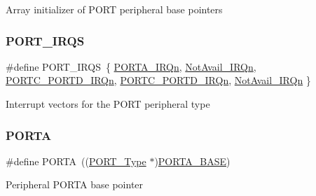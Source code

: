Array initializer of P\+O\+RT peripheral base pointers \mbox{\label{group___p_o_r_t___peripheral___access___layer_ga442cafa4ce211d588393a5f2954198bb}} 
\subsubsection{\texorpdfstring{PORT\_IRQS}{PORT\_IRQS}}
{\footnotesize\ttfamily \#define P\+O\+R\+T\+\_\+\+I\+R\+QS~\{ \mbox{\hyperlink{group___interrupt__vector__numbers_gga666eb0caeb12ec0e281415592ae89083ab9d085b02f1b3c2ed7b0b7fe6ae4c947}{P\+O\+R\+T\+A\+\_\+\+I\+R\+Qn}}, \mbox{\hyperlink{group___interrupt__vector__numbers_gga666eb0caeb12ec0e281415592ae89083a1f4ef0294648930fce11a95a3000197d}{Not\+Avail\+\_\+\+I\+R\+Qn}}, \mbox{\hyperlink{group___interrupt__vector__numbers_gga666eb0caeb12ec0e281415592ae89083ae07c0b38885bc05763138de5d5198fa4}{P\+O\+R\+T\+C\+\_\+\+P\+O\+R\+T\+D\+\_\+\+I\+R\+Qn}}, \mbox{\hyperlink{group___interrupt__vector__numbers_gga666eb0caeb12ec0e281415592ae89083ae07c0b38885bc05763138de5d5198fa4}{P\+O\+R\+T\+C\+\_\+\+P\+O\+R\+T\+D\+\_\+\+I\+R\+Qn}}, \mbox{\hyperlink{group___interrupt__vector__numbers_gga666eb0caeb12ec0e281415592ae89083a1f4ef0294648930fce11a95a3000197d}{Not\+Avail\+\_\+\+I\+R\+Qn}} \}}

Interrupt vectors for the P\+O\+RT peripheral type \mbox{\label{group___p_o_r_t___peripheral___access___layer_ga7c8a7f98a98d8cb125dd57a66720ab30}} 
\subsubsection{\texorpdfstring{PORTA}{PORTA}}
{\footnotesize\ttfamily \#define P\+O\+R\+TA~((\mbox{\hyperlink{struct_p_o_r_t___type}{P\+O\+R\+T\+\_\+\+Type}} $\ast$)\mbox{\hyperlink{group___p_o_r_t___peripheral___access___layer_gae3d20f730f9619aabbf94e2efd1de34c}{P\+O\+R\+T\+A\+\_\+\+B\+A\+SE}})}

Peripheral P\+O\+R\+TA base pointer \mbox{\label{group___p_o_r_t___peripheral___access___layer_gae3d20f730f9619aabbf94e2efd1de34c}} 
